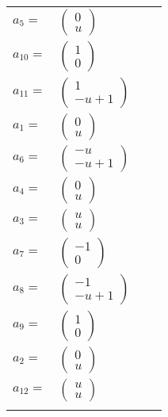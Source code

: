 \documentclass[1p]{elsarticle_modified}
\theoremstyle{definition}
\begin{document}
\begin{tabular}{m{7pt} m{180pt} m{7pt} m{180pt} }
\flushright $a_{5}=$&$\begin{pmatrix}0\\u\end{pmatrix}$ \\
\flushright $a_{10}=$&$\begin{pmatrix}1\\0\end{pmatrix}$ \\
\flushright $a_{11}=$&$\begin{pmatrix}1\\- u+1\end{pmatrix}$ \\
\flushright $a_{1}=$&$\begin{pmatrix}0\\u\end{pmatrix}$ \\
\flushright $a_{6}=$&$\begin{pmatrix}- u\\- u+1\end{pmatrix}$ \\
\flushright $a_{4}=$&$\begin{pmatrix}0\\u\end{pmatrix}$ \\
\flushright $a_{3}=$&$\begin{pmatrix}u\\u\end{pmatrix}$ \\
\flushright $a_{7}=$&$\begin{pmatrix}-1\\0\end{pmatrix}$ \\
\flushright $a_{8}=$&$\begin{pmatrix}-1\\- u+1\end{pmatrix}$ \\
\flushright $a_{9}=$&$\begin{pmatrix}1\\0\end{pmatrix}$ \\
\flushright $a_{2}=$&$\begin{pmatrix}0\\u\end{pmatrix}$ \\
\flushright $a_{12}=$&$\begin{pmatrix}u\\u\end{pmatrix}$\\&\end{tabular}
\end{document}
